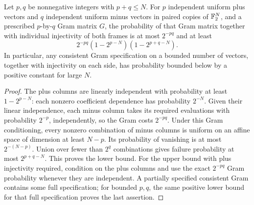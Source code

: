 \begin{lemma}\label{lem:gram-frame-normalization}
Let \(p,q\) be nonnegative integers with \(p+q\le N\).
For \(p\) independent uniform plus vectors and \(q\) independent uniform minus vectors in paired copies of \(\mathbb F_2^N\), and a prescribed \(p\)-by-\(q\) Gram matrix \(G\), the probability of that Gram matrix together with individual injectivity of both frames is at most \(2^{-pq}\) and at least
\begin{equation}\label{eq:bounded-gram-normalization}
 2^{-pq}(1-2^{p-N})(1-2^{p+q-N}).
\end{equation}
In particular, any consistent Gram specification on a bounded number of vectors, together with injectivity on each side, has probability bounded below by a positive constant for large \(N\).
\end{lemma}
\begin{proof}
The plus columns are linearly independent with probability at least \(1-2^{p-N}\): each nonzero coefficient dependence has probability \(2^{-N}\).
Given their linear independence, each minus column takes its required evaluations with probability \(2^{-p}\), independently, so the Gram costs \(2^{-pq}\).
Under this Gram conditioning, every nonzero combination of minus columns is uniform on an affine space of dimension at least \(N-p\).
Its probability of vanishing is at most \(2^{-(N-p)}\).
Union over fewer than \(2^q\) combinations gives failure probability at most \(2^{p+q-N}\).
This proves the lower bound.
For the upper bound with plus injectivity required, condition on the plus columns and use the exact \(2^{-pq}\) Gram probability whenever they are independent.
A partially specified consistent Gram contains some full specification; for bounded \(p,q\), the same positive lower bound for that full specification proves the last assertion.
\end{proof}

